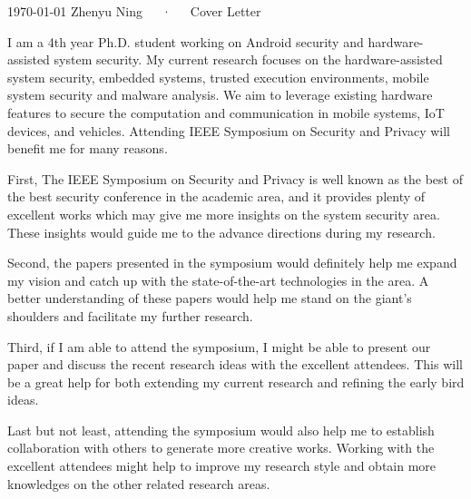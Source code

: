 \documentclass[11pt, a4paper]{awesome-cv}
\begin{document}
\makecvheader[R]

\makecvfooter
  {\today}
  {Zhenyu Ning~~~·~~~Cover Letter}
  {}

\makelettertitle

\begin{cvletter}

I am a 4th year Ph.D. student working on Android security and hardware-assisted
system security. My current research focuses on the hardware-assisted system security, embedded
systems, trusted execution environments, mobile system security and malware analysis. We aim to
leverage existing hardware features to secure the computation and communication in mobile systems, IoT 
devices, and vehicles. Attending IEEE Symposium on Security and Privacy will benefit me for many
reasons.

First, The IEEE Symposium on Security and Privacy is well known as the best of the best security 
conference in the academic area, and it provides plenty of excellent works which may give me more 
insights on the system security area. These insights would guide me to the advance directions during
my research.

Second, the papers presented in the symposium would definitely help me expand my vision and catch up 
with the state-of-the-art technologies in the area. A better understanding of these papers would help
me stand on the giant's shoulders and facilitate my further research.

Third,  if I am able to attend the symposium, I might be able to present our paper and discuss the recent 
research ideas with the excellent attendees. This will be a great help for both extending my current
research and refining the early bird ideas.

Last but not least, attending the symposium would also help me to establish collaboration with others to 
generate more creative works. Working with the excellent attendees might help to improve my research
style and obtain more knowledges on the other related research areas.

\end{cvletter}


\makeletterclosing
\end{document}
